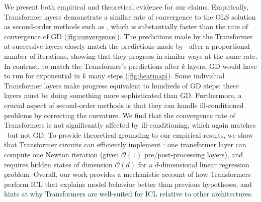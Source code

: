 We present both empirical and theoretical evidence for our claims. Empirically, Transformer layers demonstrate a similar rate of convergence to the OLS solution as second-order methods such as \newton, which is substantially faster than the rate of convergence of GD (\cref{fig:convergence}). 
The predictions made by the Transformer at successive layers closely match the predictions made by \newton\ after a proportional number of iterations, showing that they progress in similar ways at the same rate.
In contrast, to match the Transformer's predictions after $k$ layers, GD would have to run for  exponential in $k$ many steps (\cref{fig:heatmap}). Some individual Transformer layers make progress equivalent to hundreds of GD steps: these layers must be doing something more sophisticated than GD.
Furthermore, a crucial aspect of second-order methods is that they can handle ill-conditioned problems by correcting the curvature. We find that the convergence rate of Transformers is not significantly affected by ill-conditioning, which again matches \newton\ but not GD. %
To provide theoretical grounding to our empirical results, we show that Transformer circuits can efficiently implement \newton: one transformer layer can compute one Newton iteration (given $\mathcal O(1)$ pre/post-processing layers), and requires hidden states of dimension $\mathcal O(d)$ for a $d$-dimensional linear regression problem.
Overall, our work provides a mechanistic account of how Transformers perform ICL that explains model behavior better than previous hypotheses, and hints at why Transformers are well-suited for ICL relative to other architectures. 

\iffalse


